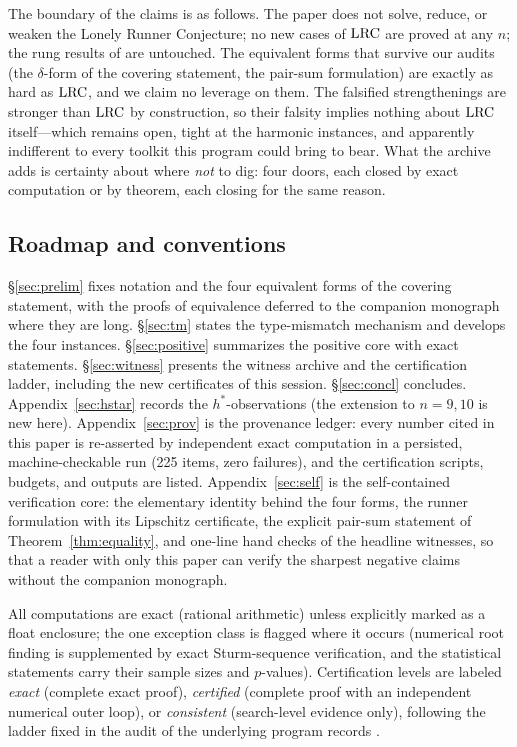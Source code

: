 The boundary of the claims is as follows. The paper does not solve,
reduce, or weaken the Lonely Runner Conjecture; no new cases of $\mathrm{LRC}$
are proved at any $n$; the rung results of
\cite{Rosenfeld8,Trakulthongchai,Sungkawichai,Allikvere} are untouched.
The equivalent forms that survive our audits (the $\delta$-form of the
covering statement, the pair-sum formulation) are exactly as hard as
$\mathrm{LRC}$, and we claim no leverage on them. The falsified strengthenings
are stronger than $\mathrm{LRC}$ by construction, so their falsity implies
nothing about $\mathrm{LRC}$ itself---which remains open, tight at the harmonic
instances, and apparently indifferent to every toolkit this program could
bring to bear. What the archive adds is certainty about where \emph{not}
to dig: four doors, each closed by exact computation or by theorem, each
closing for the same reason.

\subsection{Roadmap and conventions}

\S\ref{sec:prelim} fixes notation and the four equivalent forms of the
covering statement, with the proofs of equivalence deferred to the
companion monograph where they are long. \S\ref{sec:tm} states the
type-mismatch mechanism and develops the four instances.
\S\ref{sec:positive} summarizes the positive core with exact statements.
\S\ref{sec:witness} presents the witness archive and the certification
ladder, including the new certificates of this session.
\S\ref{sec:concl} concludes. Appendix~\ref{sec:hstar} records the
$h^*$-observations (the extension to $n=9,10$ is new here).
Appendix~\ref{sec:prov} is the provenance ledger: every number cited in
this paper is re-asserted by independent exact computation in a
persisted, machine-checkable run (225 items, zero failures), and the
certification scripts, budgets, and outputs are listed.
Appendix~\ref{sec:self} is the self-contained verification core: the
elementary identity behind the four forms, the runner formulation with
its Lipschitz certificate, the explicit pair-sum statement of
Theorem~\ref{thm:equality}, and one-line hand checks of the headline
witnesses, so that a reader with only this paper can verify the sharpest
negative claims without the companion monograph.

All computations are exact (rational arithmetic) unless explicitly marked
as a float enclosure; the one exception class is flagged where it occurs
(numerical root finding is supplemented by exact Sturm-sequence
verification, and the statistical statements carry their sample sizes and
$p$-values). Certification levels are labeled \emph{exact}
(complete exact proof), \emph{certified} (complete proof with an
independent numerical outer loop), or \emph{consistent} (search-level
evidence only), following the ladder fixed in the audit of the underlying
program records \cite{prog-artifacts}.
